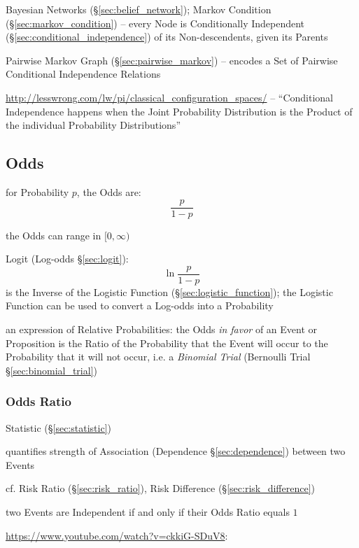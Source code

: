 \fist Bayesian Networks (\S\ref{sec:belief_network});
Markov Condition (\S\ref{sec:markov_condition}) -- every Node is Conditionally
Independent (\S\ref{sec:conditional_independence}) of its Non-descendents, given
its Parents

\fist Pairwise Markov Graph (\S\ref{sec:pairwise_markov}) -- encodes a Set
of Pairwise Conditional Independence Relations

\url{http://lesswrong.com/lw/pi/classical_configuration_spaces/}
-- ``Conditional Independence happens when the Joint Probability Distribution
is the Product of the individual Probability Distributions''



\subsection{Odds}\label{sec:odds}

for Probability $p$, the Odds are:
\[
  \frac{p}{1-p}
\]

the Odds can range in $[0, \infty)$

\fist Logit (Log-odds \S\ref{sec:logit}):
\[
  \ln \frac{p}{1-p}
\]
is the Inverse of the Logistic Function (\S\ref{sec:logistic_function}); the
Logistic Function can be used to convert a Log-odds into a Probability

an expression of Relative Probabilities: the Odds \emph{in favor} of an Event or
Proposition is the Ratio of the Probability that the Event will occur to the
Probability that it will not occur, i.e. a \emph{Binomial Trial}
(Bernoulli Trial \S\ref{sec:binomial_trial})



\subsubsection{Odds Ratio}\label{sec:odds_ratio}

Statistic (\S\ref{sec:statistic})

quantifies strength of Association (Dependence \S\ref{sec:dependence}) between
two Events

\fist cf. Risk Ratio (\S\ref{sec:risk_ratio}), Risk Difference
(\S\ref{sec:risk_difference})

two Events are Independent if and only if their Odds Ratio equals $1$

\url{https://www.youtube.com/watch?v=ckkiG-SDuV8}:

